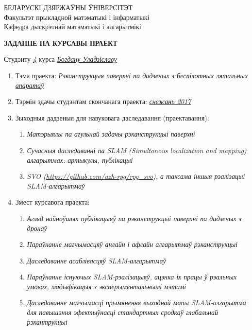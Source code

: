 \documentclass[12pt,a4paper]{extarticle}
\begin{document}
	\begin{center}
			БЕЛАРУСКІ ДЗЯРЖАЎНЫ ЎНІВЕРСІТЭТ \\
			Факультэт прыкладной матэматыкі і інфарматыкі \\
			Кафедра дыскрэтнай матэматыкі і алгарытмікі \\
	\end{center}
	\vspace{30pt}
	\begin{center}
		\textbf{
			ЗАДАННЕ НА КУРСАВЫ ПРАЕКТ \\
		}
	\end{center}
	\vspace{10pt}
	Студэнту \underline{\hspace{5pt}\textit{4}\hspace{5pt}} курса \underline{\hspace{120pt}\textit{Богдану Уладзіславу}\hspace{120pt}} \\
	\renewcommand{\labelenumii}{\arabic{enumi}.\arabic{enumii}.}
	\begin{enumerate}
		\item Тэма праекта: \underline{\textit{Рэканструкцыя паверхні па дадзеных з беспілотных лятальных}} \\
		\underline{\textit{апаратаў}}
		\item Тэрмін здачы студэнтам скончанага праекта: \underline{\textit{снежань 2017}}
		\item Зыходныя дадзеныя для навуковага даследавання (праектавання):
		\begin{enumerate}
			\item \textit{Матэрыялы па агульнай задачы рэканструкцыі паверхні}
			\item \textit{Сучасныя даследаванні па SLAM (Simultanous localization and mapping) алгарытмах: артыкулы, публікацыі}
			\item \textit{SVO (\url{https://github.com/uzh-rpg/rpg\_svo}), а таксама іншыя рэалізацыі SLAM-алгарытмаў}
		\end{enumerate}
		\item Змест курсавога праекта:
		\begin{enumerate}
			\item \textit{Агляд найноўшых публікацыяў па рэканструкцыі паверхні па дадзеных з дронаў}
			\item \textit{Параўнанне магчымасцяў анлайн і афлайн алгарытмаў рэканструкцыі}
			\item \textit{Даследаванне асаблівасцяў SLAM-алгарытмаў}
			\item \textit{Параўнанне існуючых SLAM-рэалізацыяў, ацэнка іх працы ў рэальных умовах, мадыфікацыя з эксперыментальнымі мэтамі}
			\item \textit{Даследаванне магчымасці прымянення выходнай мапы SLAM-алгарытма для павышэння эфектыўнасці стандартных сродкаў глабальнай рэкантрукцыі}
		\end{enumerate}
	\end{enumerate}
\end{document}
